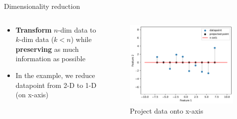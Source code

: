 \begin{frame}{Dimensionality reduction}
    \begin{columns}
        \begin{column}{0.6\textwidth}
            \begin{itemize}
                \item \textbf{Transform} $n$-dim data to $k$-dim data ($k<n$) while \textbf{preserving} as much information as possible
                \item In the example, we reduce datapoint from 2-D to 1-D (on x-axis)
            \end{itemize}
        \end{column}

        \begin{column}{0.5\textwidth}
            \begin{figure}
                \centering
                \includegraphics[width=\linewidth]{img/dp.pdf}
                \caption{Project data onto x-axis}
                \label{fig:enter-label}
            \end{figure}
        \end{column}
    \end{columns}
\end{frame}

